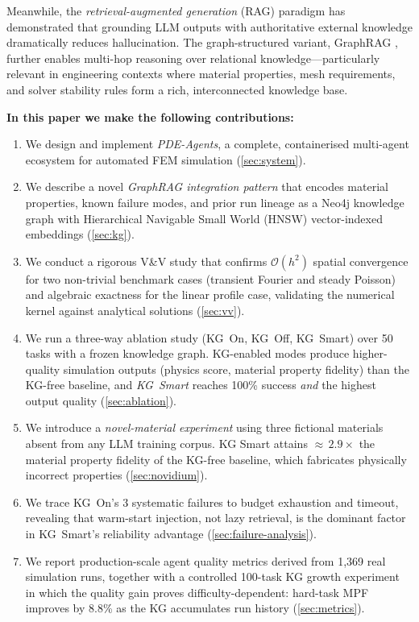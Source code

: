 \documentclass[preprint,review,12pt]{elsarticle}
\begin{document}
Meanwhile, the \emph{retrieval-augmented generation} (RAG) paradigm
\citep{lewis2020rag} has demonstrated that grounding LLM outputs with
authoritative external knowledge dramatically reduces hallucination.  The
graph-structured variant, GraphRAG \citep{edge2024graphrag}, further enables
multi-hop reasoning over relational knowledge—particularly relevant in
engineering contexts where material properties, mesh requirements, and solver
stability rules form a rich, interconnected knowledge base.

\textbf{In this paper we make the following contributions:}
\begin{enumerate}
  \item We design and implement \textit{PDE-Agents}, a complete, containerised
        multi-agent ecosystem for automated FEM simulation
        (\cref{sec:system}).
  \item We describe a novel \emph{GraphRAG integration pattern} that encodes
        material properties, known failure modes, and prior run lineage as a
        Neo4j knowledge graph with Hierarchical Navigable Small World
        (HNSW) vector-indexed embeddings \citep{malkov2020hnsw}
        (\cref{sec:kg}).
  \item We conduct a rigorous V\&V study that confirms $\mathcal{O}(h^2)$
        spatial convergence for two non-trivial benchmark cases
        (transient Fourier and steady Poisson) and algebraic exactness
        for the linear profile case, validating
        the numerical kernel against analytical solutions
        (\cref{sec:vv}).
  \item We run a three-way ablation study (KG~On, KG~Off, KG~Smart)
        over 50 tasks with a frozen knowledge graph.  KG-enabled modes
        produce higher-quality simulation outputs (physics score,
        material property fidelity) than the KG-free baseline, and
        \emph{KG~Smart} reaches 100\% success \emph{and} the highest
        output quality (\cref{sec:ablation}).
  \item We introduce a \emph{novel-material experiment} using three
        fictional materials absent from any LLM training corpus.
        KG Smart attains ${\approx}\,2.9\times$ the material property
        fidelity of the KG-free baseline, which fabricates physically
        incorrect properties (\cref{sec:novidium}).
  \item We trace KG~On's 3 systematic failures to budget exhaustion
        and timeout, revealing that warm-start injection, not lazy
        retrieval, is the dominant factor in KG~Smart's reliability
        advantage (\cref{sec:failure-analysis}).
  \item We report production-scale agent quality metrics derived from
        1{,}369 real simulation runs, together with a controlled
        100-task KG growth experiment in which the quality gain proves
        difficulty-dependent: hard-task MPF improves by 8.8\% as the KG
        accumulates run history (\cref{sec:metrics}).
\end{enumerate}
\end{document}
